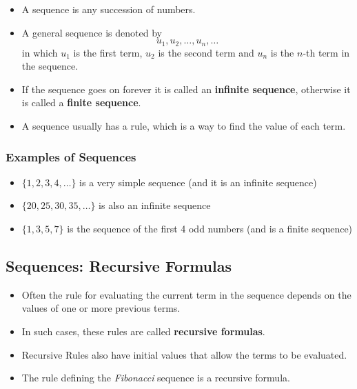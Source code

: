 \documentclass[]{report}
\begin{document}
\newpage






\begin{itemize}
\item A sequence is any succession of numbers. 
\item A general sequence is denoted by
\[ u_1, u_2, \ldots , u_n, \ldots \]
in which $u_1$ is the first term, $u_2$ is the second term and $u_n$ is the $n$-th 
term in the sequence.
\item If the sequence goes on forever it is called an \textbf{infinite sequence},
otherwise it is called a \textbf{finite sequence}.
\item A sequence usually has a rule, which is a way to find the value of each term.
\end{itemize}


\subsubsection{Examples of Sequences}
\begin{itemize}
\item $\{1, 2, 3, 4 ,\ldots\}$ is a very simple sequence (and it is an infinite sequence)
\item $\{20, 25, 30, 35, \ldots \}$ is also an infinite sequence
\item $\{1, 3, 5, 7\}$ is the sequence of the first 4 odd numbers (and is a finite sequence)
\end{itemize}


\subsection{Sequences: Recursive Formulas}
\begin{itemize}
\item Often the rule for evaluating the current term in the sequence depends on the values of one or more previous terms.
\item In such cases, these rules are called \textbf{recursive formulas}.
\item Recursive Rules also have initial values that allow the terms to be evaluated.
\item The rule defining the \textit{Fibonacci} sequence is a recursive formula.
\end{itemize}
\end{document}
